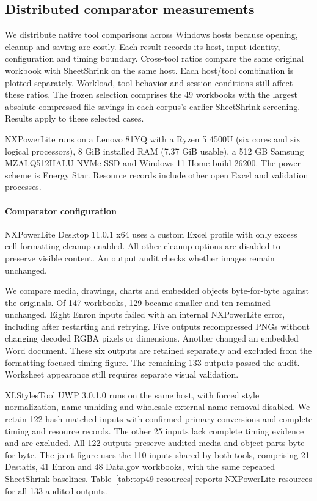 \subsection{Distributed comparator measurements}
We distribute native tool comparisons across Windows hosts because opening,
cleanup and saving are costly. Each result records its host, input identity,
configuration and timing boundary. Cross-tool ratios compare the same original
workbook with SheetShrink on the same host. Each host/tool combination is plotted
separately. Workload, tool behavior and session conditions still affect these
ratios. The frozen selection comprises the 49 workbooks with the largest absolute
compressed-file savings in each corpus's earlier SheetShrink screening. Results
apply to these selected cases.

NXPowerLite runs on a Lenovo 81YQ with a Ryzen 5 4500U (six cores and six logical
processors), 8 GiB installed RAM (7.37 GiB usable), a 512 GB Samsung MZALQ512HALU
NVMe SSD and Windows 11 Home build 26200. The power scheme is Energy Star.
Resource records include other open Excel and validation processes.

\paragraph{Comparator configuration}
NXPowerLite Desktop 11.0.1 x64 uses a custom Excel profile with only excess
cell-formatting cleanup enabled. All other cleanup options are disabled to
preserve visible content. An output audit checks whether images remain unchanged.

We compare media, drawings, charts and embedded objects byte-for-byte against the
originals. Of 147 workbooks, 129 became smaller and ten remained unchanged. Eight
Enron inputs failed with an internal NXPowerLite error, including after restarting
and retrying. Five outputs recompressed PNGs without changing decoded RGBA pixels
or dimensions. Another changed an embedded Word document. These six outputs are
retained separately and excluded from the formatting-focused timing figure. The
remaining 133 outputs passed the audit. Worksheet appearance still requires
separate visual validation.

XLStylesTool UWP 3.0.1.0 runs on the same host, with forced style normalization,
name unhiding and wholesale external-name removal disabled. We retain 122
hash-matched inputs with confirmed primary conversions and complete timing and
resource records. The other 25 inputs lack complete timing evidence and are
excluded. All 122 outputs preserve audited media and object parts byte-for-byte.
The joint figure uses the 110 inputs shared by both tools, comprising 21 Destatis,
41 Enron and 48 Data.gov workbooks, with the same repeated SheetShrink baselines.
Table~\ref{tab:top49-resources} reports NXPowerLite resources for all 133 audited
outputs.

